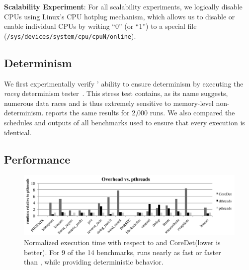  
\textbf{Scalability Experiment}: For all scalability experiments, we logically disable CPUs using Linux's CPU hotplug mechanism, which allows us to disable or enable individual CPUs by writing ``0'' (or ``1'') to a special file (\texttt{/sys/devices/system/cpu/cpuN/online}).

\subsection{Determinism}

We first experimentally verify \dthreads{}' ability to ensure determinism by executing the \emph{racey} determinism tester~\cite{1508256}. This stress test contains, as its name suggests, numerous data races and is thus extremely sensitive to memory-level non-determinism. \dthreads{} reports the same results for 2,000 runs. We also compared the schedules and outputs of all benchmarks used to ensure that every execution is identical.

\subsection{Performance}
\label{sec:performance}

\begin{figure}[!t]
{\centering
\includegraphics[width=6in]{dthreads/figure/overhead-figure}
\caption{Normalized execution time with respect to \pthreads{} and CoreDet(lower is better). For 9 of the 14 benchmarks, \dthreads{} runs nearly as fast or faster than \pthreads{}, while providing deterministic behavior.\label{fig:performance}}
}
\end{figure}

